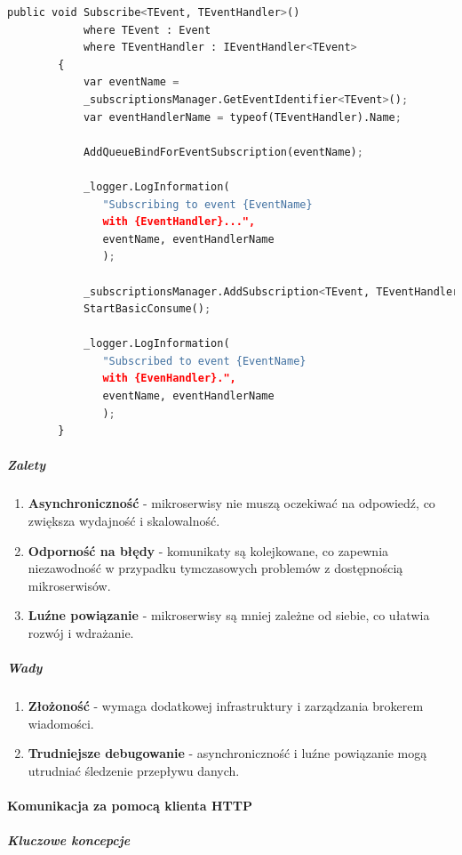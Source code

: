 \begin{lstlisting}[language=Python, caption=Implementacja kolejki RabbitMq, linewidth=160mm]
		public void Subscribe<TEvent, TEventHandler>()
			where TEvent : Event
			where TEventHandler : IEventHandler<TEvent>
		{
			var eventName = 
            _subscriptionsManager.GetEventIdentifier<TEvent>();
			var eventHandlerName = typeof(TEventHandler).Name;

			AddQueueBindForEventSubscription(eventName);

			_logger.LogInformation(
               "Subscribing to event {EventName} 
               with {EventHandler}...", 
               eventName, eventHandlerName
               );

			_subscriptionsManager.AddSubscription<TEvent, TEventHandler>();
			StartBasicConsume();

			_logger.LogInformation(
               "Subscribed to event {EventName} 
               with {EvenHandler}.", 
               eventName, eventHandlerName
               );
		}
\end{lstlisting}

\subparagraph{Zalety}

\begin{enumerate}
\item {\bf Asynchroniczność} - mikroserwisy nie muszą oczekiwać na odpowiedź, co zwiększa wydajność i skalowalność.
\item {\bf Odporność na błędy} - komunikaty są kolejkowane, co zapewnia niezawodność w przypadku tymczasowych problemów z dostępnością mikroserwisów.
\item {\bf Luźne powiązanie} - mikroserwisy są mniej zależne od siebie, co ułatwia rozwój i wdrażanie.
\end{enumerate}

\subparagraph{Wady}

\begin{enumerate}
\item {\bf Złożoność} - wymaga dodatkowej infrastruktury i zarządzania brokerem wiadomości.
\item {\bf Trudniejsze debugowanie} - asynchroniczność i luźne powiązanie mogą utrudniać śledzenie przepływu danych.
\end{enumerate}

\paragraph {Komunikacja za pomocą klienta HTTP}

\subparagraph{Kluczowe koncepcje}

